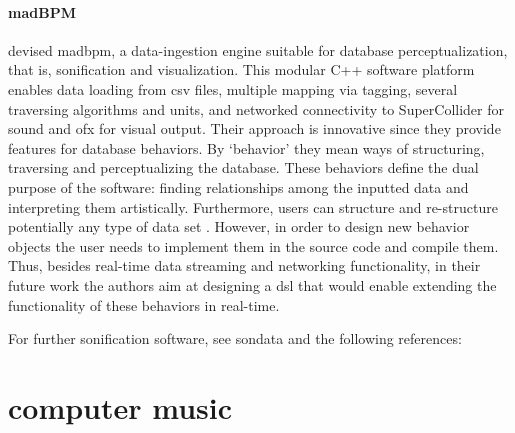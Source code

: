 \documentclass[
]{book}
\begin{document}
\paragraph{madBPM}
\textcite{icmc/bbp2372.2017.087} devised \gls{madbpm}, a data-ingestion engine suitable for database perceptualization, that is, sonification and visualization. This modular C++ software platform enables data loading from \gls{csv} files, multiple mapping via tagging, several traversing algorithms and units, and networked connectivity to SuperCollider for sound and \gls{ofx} for visual output. Their approach is innovative since they provide features for database behaviors. By `behavior' they mean ways of structuring, traversing and perceptualizing the database. These behaviors define the dual purpose of the software: finding relationships among the inputted data and interpreting them artistically. Furthermore, users can structure and re-structure potentially any type of data set \parencite[504]{icmc/bbp2372.2017.087}. However, in order to design new behavior objects the user needs to implement them in the source code and compile them. Thus, besides real-time data streaming and networking functionality, in their future work the authors aim at designing a \gls{dsl} that would enable extending the functionality of these behaviors in real-time.

For further sonification software, see \gls{sondata} and the following references: \textcites{Wil96:Lis}{Pau04:ATo}{Lod98:MUS}{Bei09:Aes}{Her14:Aso}{DBLP:conf/icad/2007/Worral}{DBLP:conf/icad/2003/Walker}{domenico_vicinanza_2006_849321}



\section{computer music}
\end{document}
